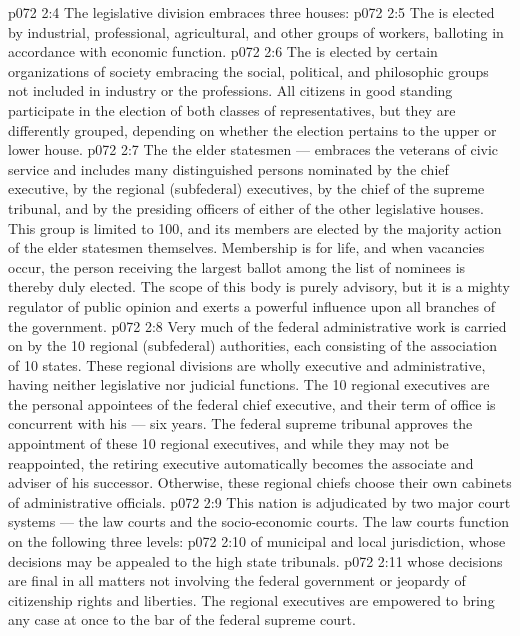 \vs p072 2:4 \pc The legislative division embraces three houses:
\vs p072 2:5 \bibnobreakspace The  is elected by industrial, professional, agricultural, and other groups of workers, balloting in accordance with economic function.
\vs p072 2:6 \bibnobreakspace The  is elected by certain organizations of society embracing the social, political, and philosophic groups not included in industry or the professions. All citizens in good standing participate in the election of both classes of representatives, but they are differently grouped, depending on whether the election pertains to the upper or lower house.
\vs p072 2:7 \bibnobreakspace The  the elder statesmen --- embraces the veterans of civic service and includes many distinguished persons nominated by the chief executive, by the regional (subfederal) executives, by the chief of the supreme tribunal, and by the presiding officers of either of the other legislative houses. This group is limited to 100, and its members are elected by the majority action of the elder statesmen themselves. Membership is for life, and when vacancies occur, the person receiving the largest ballot among the list of nominees is thereby duly elected. The scope of this body is purely advisory, but it is a mighty regulator of public opinion and exerts a powerful influence upon all branches of the government.
\vs p072 2:8 \pc Very much of the federal administrative work is carried on by the 10 regional (subfederal) authorities, each consisting of the association of 10 states. These regional divisions are wholly executive and administrative, having neither legislative nor judicial functions. The 10 regional executives are the personal appointees of the federal chief executive, and their term of office is concurrent with his --- six years. The federal supreme tribunal approves the appointment of these 10 regional executives, and while they may not be reappointed, the retiring executive automatically becomes the associate and adviser of his successor. Otherwise, these regional chiefs choose their own cabinets of administrative officials.
\vs p072 2:9 \pc This nation is adjudicated by two major court systems --- the law courts and the socio\hyp{}economic courts. The law courts function on the following three levels:
\vs p072 2:10 \bibnobreakspace {} of municipal and local jurisdiction, whose decisions may be appealed to the high state tribunals.
\vs p072 2:11 \bibnobreakspace {} whose decisions are final in all matters not involving the federal government or jeopardy of citizenship rights and liberties. The regional executives are empowered to bring any case at once to the bar of the federal supreme court.
